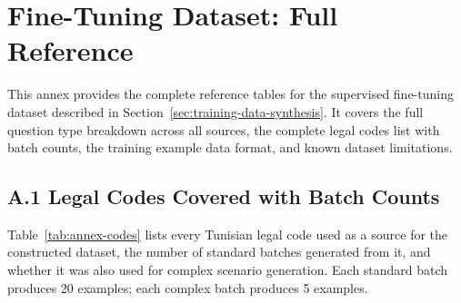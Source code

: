 \chapter{Fine-Tuning Dataset: Full Reference}
\label{annex:dataset}

This annex provides the complete reference tables for the supervised fine-tuning dataset described in Section~\ref{sec:training-data-synthesis}. It covers the full question type breakdown across all sources, the complete legal codes list with batch counts, the training example data format, and known dataset limitations.

\section*{A.1 \quad Legal Codes Covered with Batch Counts}

Table~\ref{tab:annex-codes} lists every Tunisian legal code used as a source for the constructed dataset, the number of standard batches generated from it, and whether it was also used for complex scenario generation. Each standard batch produces 20 examples; each complex batch produces 5 examples.

